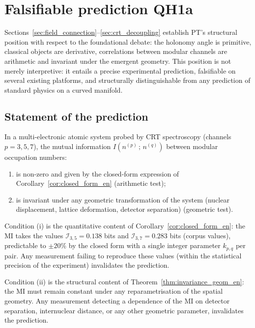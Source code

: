 \section{Falsifiable prediction QH1a}
\label{sec:qh1a_prediction}

Sections~\ref{sec:field_connection}--\ref{sec:crt_decoupling}
establish PT's structural position with respect to the
foundational debate: the holonomy angle is primitive, classical
objects are derivative, correlations between modular channels are
arithmetic and invariant under the emergent geometry. This
position is not merely interpretive: it entails a precise
experimental prediction, falsifiable on several existing
platforms, and structurally distinguishable from any prediction
of standard physics on a curved manifold.

\subsection{Statement of the prediction}
\label{ssec:qh1a_statement_en}

\begin{prediction}
\label{pred:qh1a_en}
In a multi-electronic atomic system probed by CRT spectroscopy
(channels $p = 3, 5, 7$), the mutual information
$I(n^{(p)}\,;\,n^{(q)})$ between modular occupation numbers:
\begin{enumerate}[label=(\roman*),nosep]
  \item is non-zero and given by the closed-form expression of
  Corollary~\ref{cor:closed_form_en} (arithmetic test);
  \item is invariant under any geometric transformation of the
  system (nuclear displacement, lattice deformation, detector
  separation) (geometric test).
\end{enumerate}
\end{prediction}

Condition (i) is the quantitative content of
Corollary~\ref{cor:closed_form_en}: the MI takes the values
$\mathcal{I}_{3,5} = 0.138$ bits and
$\mathcal{I}_{3,7} = 0.283$ bits (corpus values), predictable to
$\pm 20\%$ by the closed form with a single integer parameter
$k_{p,q}$ per pair. Any measurement failing to reproduce these
values (within the statistical precision of the experiment)
invalidates the prediction.

Condition (ii) is the structural content of
Theorem~\ref{thm:invariance_geom_en}: the MI must remain constant
under any reparametrisation of the spatial geometry. Any
measurement detecting a dependence of the MI on detector
separation, internuclear distance, or any other geometric
parameter, invalidates the prediction.

